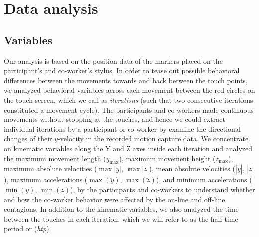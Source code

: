 \documentclass[a4paper, 12pt, oneside]{Thesis}  %
\begin{document}
\clearpage
\section{Data analysis}

\subsection{Variables}
Our analysis is based on the position data of the markers placed on the participant's and co-worker's stylus. In order to tease out possible behavioral differences between the movements towards and back between the touch points, we analyzed behavioral variables across each movement between the red circles on the touch-screen, which we call as \textit{iterations} (such that two consecutive iterations constituted a movement cycle). The participants and co-workers made continuous movements without stopping at the touches, and hence we could extract individual iterations by a participant or co-worker by examine the directional changes of their $y$-velocity in the recorded motion capture data. We concentrate on kinematic variables along the Y and Z axes inside each iteration and analyzed the maximum movement length ($y_{\max}$), maximum movement height ($z_{\max}$), maximum absolute velocities ($\max|\dot{y}|$, $\max|\dot{z}|$), mean absolute velocities ($|\overline{\dot{y}}|$, $|\overline{\dot{z}}|$), maximum accelerations ($\max(\ddot{y})$, $\max(\ddot{z})$), and minimum accelerations ($\min(\ddot{y})$, $\min(\ddot{z})$), by the participants and co-workers to understand whether and how the co-worker behavior were affected by the on-line and off-line contagions. In addition to the kinematic variables, we also analyzed the time between the touches in each iteration, which we will refer to as the half-time period or ({\it htp}).
\end{document}
